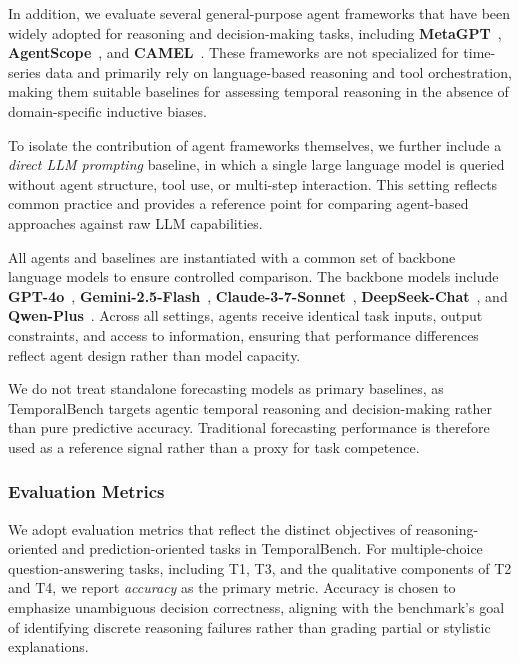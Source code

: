In addition, we evaluate several general-purpose agent frameworks that have been widely adopted for reasoning and decision-making tasks, including \textbf{MetaGPT}~\cite{hong2024metagpt}, \textbf{AgentScope}~\cite{gao2024agentscope}, and \textbf{CAMEL}~\cite{li2023camel}.
These frameworks are not specialized for time-series data and primarily rely on language-based reasoning and tool orchestration, making them suitable baselines for assessing temporal reasoning in the absence of domain-specific inductive biases.

To isolate the contribution of agent frameworks themselves, we further include a \emph{direct LLM prompting} baseline, in which a single large language model is queried without agent structure, tool use, or multi-step interaction.
This setting reflects common practice and provides a reference point for comparing agent-based approaches against raw LLM capabilities.

All agents and baselines are instantiated with a common set of backbone language models to ensure controlled comparison.
The backbone models include \textbf{GPT-4o}~\cite{hurst2024gpt}, \textbf{Gemini-2.5-Flash}~\cite{gemini25flash}, \textbf{Claude-3-7-Sonnet}~\cite{claude37sonnet}, \textbf{DeepSeek-Chat}~\cite{liu2024deepseek}, and \textbf{Qwen-Plus}~\cite{bai2023qwen}.
Across all settings, agents receive identical task inputs, output constraints, and access to information, ensuring that performance differences reflect agent design rather than model capacity.

We do not treat standalone forecasting models as primary baselines, as TemporalBench targets agentic temporal reasoning and decision-making rather than pure predictive accuracy.
Traditional forecasting performance is therefore used as a reference signal rather than a proxy for task competence.

\subsubsection{Evaluation Metrics}

We adopt evaluation metrics that reflect the distinct objectives of reasoning-oriented and prediction-oriented tasks in TemporalBench. For multiple-choice question-answering tasks, including T1, T3, and the qualitative components of T2 and T4, we report \emph{accuracy} as the primary metric. Accuracy is chosen to emphasize unambiguous decision correctness, aligning with the benchmark’s goal of identifying discrete reasoning failures rather than grading partial or stylistic explanations.

